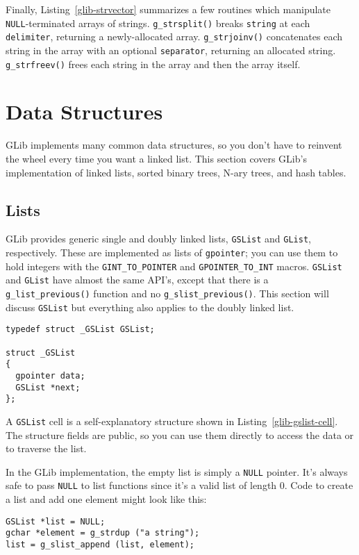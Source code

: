 Finally, Listing~\ref{glib-strvector} summarizes a few routines which manipulate \lstinline{NULL}-terminated arrays of strings. \lstinline{g_strsplit()} breaks \lstinline{string} at each \lstinline{delimiter}, returning a newly-allocated array. \lstinline{g_strjoinv()} concatenates each string in the array with an optional \lstinline{separator}, returning an allocated string. \lstinline{g_strfreev()} frees each string in the array and then the array itself.

\section{Data Structures}

GLib implements many common data structures, so you don't have to reinvent the wheel every time you want a linked list. This section covers GLib's implementation of linked lists, sorted binary trees, N-ary trees, and hash tables.

\subsection{Lists}

GLib provides generic single and doubly linked lists, \lstinline{GSList} and \lstinline{GList}, respectively. These are implemented as lists of \lstinline{gpointer}; you can use them to hold integers with the \lstinline{GINT_TO_POINTER} and \lstinline{GPOINTER_TO_INT} macros. \lstinline{GSList} and \lstinline{GList} have almost the same API's, except that there is a \lstinline{g_list_previous()} function and no \lstinline{g_slist_previous()}. This section will discuss \lstinline{GSList} but everything also applies to the doubly linked list.

\begin{lstlisting}[float, caption={\lstinline{GSList} cell}, label=glib-gslist-cell]
typedef struct _GSList GSList;

struct _GSList
{
  gpointer data;
  GSList *next;
};
\end{lstlisting}

A \lstinline{GSList} cell is a self-explanatory structure shown in Listing~\ref{glib-gslist-cell}. The structure fields are public, so you can use them directly to access the data or to traverse the list.

In the GLib implementation, the empty list is simply a \lstinline{NULL} pointer. It's always safe to pass \lstinline{NULL} to list functions since it's a valid list of length 0. Code to create a list and add one element might look like this:
\begin{lstlisting}
GSList *list = NULL;
gchar *element = g_strdup ("a string");
list = g_slist_append (list, element);
\end{lstlisting}

